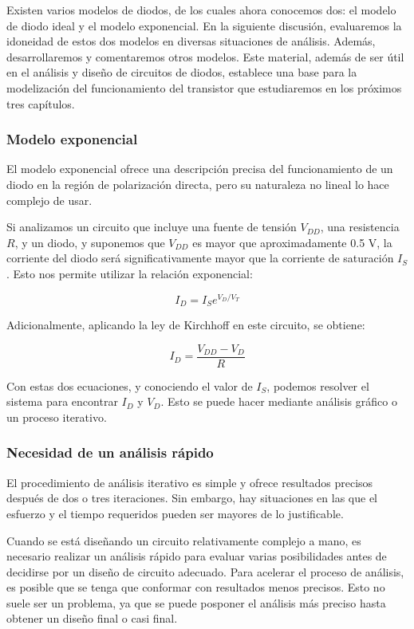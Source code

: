 Existen varios modelos de diodos, de los cuales ahora conocemos dos: el modelo de diodo ideal y el modelo exponencial. En la siguiente discusión, evaluaremos la idoneidad de estos dos modelos en diversas situaciones de análisis. Además, desarrollaremos y comentaremos otros modelos. Este material, además de ser útil en el análisis y diseño de circuitos de diodos, establece una base para la modelización del funcionamiento del transistor que estudiaremos en los próximos tres capítulos.

\subsubsection{Modelo exponencial}

El modelo exponencial ofrece una descripción precisa del funcionamiento de un diodo en la región de polarización directa, pero su naturaleza no lineal lo hace complejo de usar.

Si analizamos un circuito que incluye una fuente de tensión \( V_{DD} \), una resistencia \( R \), y un diodo, y suponemos que \( V_{DD} \) es mayor que aproximadamente 0.5 V, la corriente del diodo será significativamente mayor que la corriente de saturación \( I_S \). Esto nos permite utilizar la relación exponencial:

\[ I_D = I_S e^{V_D/V_T} \]

Adicionalmente, aplicando la ley de Kirchhoff en este circuito, se obtiene:

\[ I_D = \frac{V_{DD}-V_D}{R} \]

Con estas dos ecuaciones, y conociendo el valor de \( I_S \), podemos resolver el sistema para encontrar \( I_D \) y \( V_D \). Esto se puede hacer mediante análisis gráfico o un proceso iterativo.


\subsubsection{Necesidad de un análisis rápido}

El procedimiento de análisis iterativo es simple y ofrece resultados precisos después de dos o tres iteraciones. Sin embargo, hay situaciones en las que el esfuerzo y el tiempo requeridos pueden ser mayores de lo justificable. 

Cuando se está diseñando un circuito relativamente complejo a mano, es necesario realizar un análisis rápido para evaluar varias posibilidades antes de decidirse por un diseño de circuito adecuado. Para acelerar el proceso de análisis, es posible que se tenga que conformar con resultados menos precisos. Esto no suele ser un problema, ya que se puede posponer el análisis más preciso hasta obtener un diseño final o casi final.

